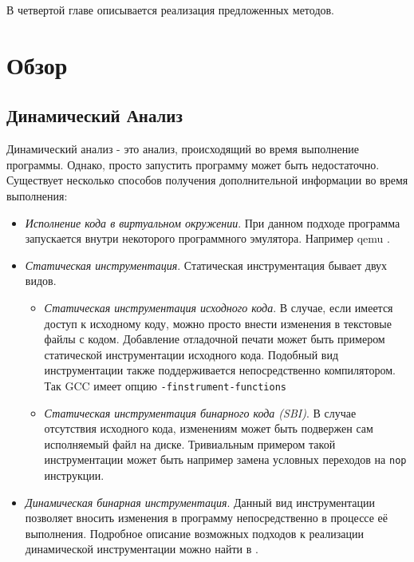 В четвертой главе описывается реализация предложенных методов.



\chapter{Обзор}


\section{Динамический Анализ}

Динамический анализ - это анализ, происходящий во время выполнение программы. Однако, просто запустить программу может быть недостаточно. Существует несколько способов получения дополнительной информации во время выполнения:

\begin{itemize}
\item {\em Исполнение кода в виртуальном окружении}. При данном подходе программа запускается внутри некоторого программного эмулятора. Например qemu \cite{QEMU}.

\item {\em Статическая инструментация}.
Статическая инструментация бывает двух видов.
    \begin{itemize}
        \item {\em Статическая инструментация исходного кода}. В случае, если имеется доступ к исходному коду, можно просто внести изменения в текстовые файлы с кодом. Добавление отладочной печати может быть примером статической инструментации исходного кода. Подобный вид инструментации также поддерживается непосредственно компилятором. Так GCC имеет опцию  \texttt{-finstrument-functions}
        \item {\em Статическая инструментация бинарного кода (SBI)}. В случае отсутствия исходного кода, изменениям может быть подвержен сам исполняемый файл на диске. Тривиальным примером такой инструментации может быть например замена условных переходов на \texttt{nop} инструкции. 
    \end{itemize}

\item {\em Динамическая бинарная инструментация}. Данный вид инструментации позволяет вносить изменения в программу непосредственно в процессе её выполнения. Подробное описание возможных подходов к реализации динамической инструментации можно найти в \cite{PBA}.
\end{itemize}

